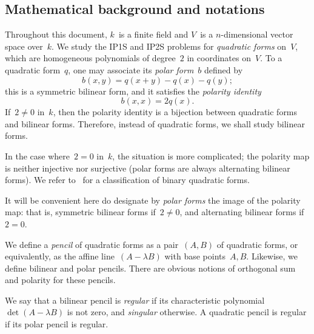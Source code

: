 \documentclass{lms}
\begin{document}
\subsection*{Mathematical background and notations}
Throughout this document, $k$~is a finite field
and $V$~is a $n$-dimensional vector space over~$k$.
We study the IP1S and IP2S problems for \emph{quadratic forms} on~$V$,
which are homogeneous polynomials of degree~$2$ in coordinates on~$V$.
To a quadratic form~$q$,
one may associate its \emph{polar form}~$b$ defined by
\begin{equation*}\label{eq:polar}
b(x,y) = q(x+y) - q(x) - q(y);
\end{equation*}
this is a symmetric bilinear form,
and it satisfies the \emph{polarity identity}
\begin{equation*}\label{eq:polarity}
b(x,x) = 2q(x).
\end{equation*}
If~$2 ≠ 0$ in~$k$, then the polarity identity is a bijection between
quadratic forms and bilinear forms.
Therefore, instead of quadratic forms, we shall study bilinear forms.

In the case where~$2 = 0$ in~$k$, the situation is more complicated;
the polarity map is neither injective nor surjective
(polar forms are always alternating bilinear forms).
We refer to~\cite{milnorhusemoller} for a classification of
binary quadratic forms.

It will be convenient here do designate by \emph{polar forms}
the image of the polarity map: that is, symmetric bilinear forms if~$2 ≠ 0$,
and alternating bilinear forms if~$2 = 0$.

\medbreak
We define a \emph{pencil} of quadratic forms
as a pair~$(A, B)$ of quadratic forms,
or equivalently, as the affine line~$(A - λ B)$ with base points~$Α, B$.
Likewise, we define bilinear and polar pencils.
There are obvious notions of orthogonal sum and polarity for these pencils.

We say that a bilinear pencil is \emph{regular}
if its characteristic polynomial~$\det (A - λ B)$ is not zero,
and \emph{singular} otherwise.
A quadratic pencil is regular if its polar pencil is regular.
\end{document}
